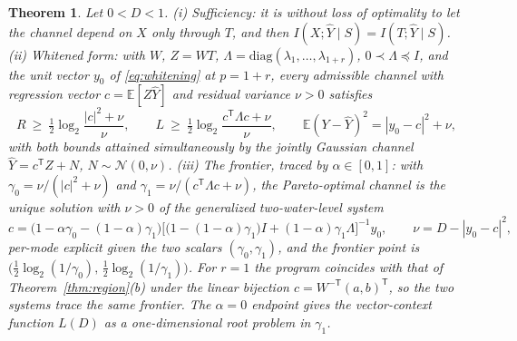 \documentclass[11pt,onecolumn]{IEEEtran}
\newtheorem{theorem}{Theorem}
\newcommand{\E}{\mathbb{E}}
\newcommand{\hY}{\widehat{Y}}
\begin{document}
\begin{theorem}\label{thm:vector}
Let $0<D<1$.
(i) \emph{Sufficiency:} it is without loss of optimality to let the
channel depend on $X$ only through $T$, and then
$I(X;\hY\mid S)=I(T;\hY\mid S)$.
(ii) \emph{Whitened form:} with $W$, $Z=WT$,
$\Lambda=\mathrm{diag}(\lambda_1,\dots,\lambda_{1+r})$,
$0\prec\Lambda\preceq I$, and the unit vector $y_0$ of
\eqref{eq:whitening} at $p=1+r$, every admissible channel with
regression vector $c=\E[Z\hY]$ and residual variance $\nu>0$ satisfies
\begin{equation}
R\ \ge\ \tfrac12\log_2\frac{|c|^2+\nu}{\nu},
\qquad
L\ \ge\ \tfrac12\log_2\frac{c^{\mathsf T}\Lambda c+\nu}{\nu},
\qquad
\E(Y-\hY)^2=|y_0-c|^2+\nu,
\label{eq:vec-bounds}
\end{equation}
with both bounds attained simultaneously by the jointly Gaussian
channel $\hY=c^{\mathsf T}Z+N$, $N\sim\mathcal N(0,\nu)$.
(iii) \emph{The frontier}, traced by $\alpha\in[0,1]$: with
$\gamma_0=\nu/(|c|^2+\nu)$ and
$\gamma_1=\nu/(c^{\mathsf T}\Lambda c+\nu)$, the Pareto-optimal channel is
the unique solution with $\nu>0$ of the generalized two-water-level
system
\begin{equation}
c=\bigl(1-\alpha\gamma_0-(1-\alpha)\gamma_1\bigr)
\bigl[\bigl(1-(1-\alpha)\gamma_1\bigr)I
+(1-\alpha)\gamma_1\Lambda\bigr]^{-1}y_0,
\qquad
\nu=D-|y_0-c|^2,
\label{eq:vecfoc}
\end{equation}
per-mode explicit given the two scalars $(\gamma_0,\gamma_1)$, and the
frontier point is
$\bigl(\tfrac12\log_2(1/\gamma_0),\,\tfrac12\log_2(1/\gamma_1)\bigr)$.
For $r=1$ the program coincides with that of Theorem~\ref{thm:region}(b)
under the linear bijection $c=W^{-\mathsf T}(a,b)^{\mathsf T}$, so the
two systems trace the same frontier. The $\alpha=0$ endpoint gives the
vector-context function $L(D)$ as a one-dimensional root problem in
$\gamma_1$.
\end{theorem}
\end{document}
